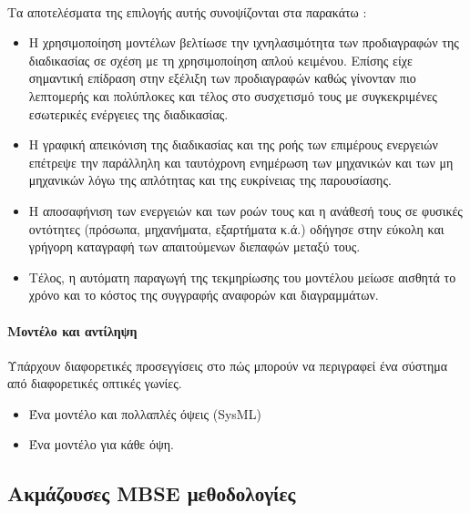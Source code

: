 \documentclass[a4paper,12pt,twoside]{report}
\begin{document}
{				\paragraph{} {Τα αποτελέσματα της επιλογής αυτής συνοψίζονται στα παρακάτω :}
				\begin{itemize}
					\item Η χρησιμοποίηση μοντέλων βελτίωσε την ιχνηλασιμότητα  των προδιαγραφών της διαδικασίας σε σχέση με τη χρησιμοποίηση απλού κειμένου. Επίσης είχε σημαντική επίδραση στην εξέλιξη των προδιαγραφών καθώς γίνονταν πιο λεπτομερής και πολύπλοκες και τέλος στο συσχετισμό τους με συγκεκριμένες εσωτερικές ενέργειες της διαδικασίας.
					\item Η γραφική απεικόνιση της διαδικασίας και της ροής των επιμέρους ενεργειών επέτρεψε την παράλληλη και ταυτόχρονη ενημέρωση των μηχανικών και των μη μηχανικών λόγω της απλότητας και της ευκρίνειας της παρουσίασης.
					\item Η αποσαφήνιση των ενεργειών και των ροών τους και η ανάθεσή τους σε φυσικές οντότητες (πρόσωπα, μηχανήματα, εξαρτήματα κ.ά.) οδήγησε στην εύκολη και γρήγορη καταγραφή των απαιτούμενων διεπαφών μεταξύ τους.
					\item Τέλος, η αυτόματη παραγωγή της τεκμηρίωσης του μοντέλου μείωσε αισθητά το χρόνο και το κόστος της συγγραφής αναφορών και διαγραμμάτων.
				\end{itemize}
				
			\paragraph{Μοντέλο και αντίληψη}{Υπάρχουν διαφορετικές προσεγγίσεις στο πώς μπορούν να περιγραφεί ένα σύστημα από διαφορετικές οπτικές γωνίες.
			\begin{itemize}
				\item Ένα μοντέλο και πολλαπλές όψεις (SysML)
				\item Ένα μοντέλο για κάθε όψη. \cite{AMechatronicDesignProcessAndItsApplication:Xiu2010}
			\end{itemize}
			
			}




		\subsection{Ακμάζουσες MBSE μεθοδολογίες}
		
}
\end{document}
